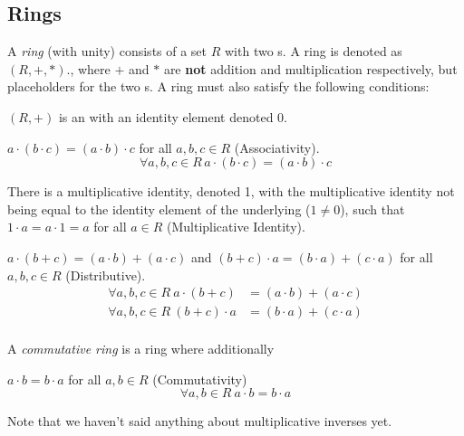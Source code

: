 \subsection{Rings}\label{subsec:Rings}
\begin{definition}[Ring]\label{def:Ring}
  A \emph{ring} (with unity) consists of a set $R$ with two s.
  A ring is denoted as $(R, +, *)$., where $+$ and $*$ are \textbf{not} addition and multiplication respectively, but placeholders for the two s.
  A ring must also satisfy the following conditions:
  \begin{propertylist}
  \item $(R, +)$ is an   with an identity element denoted 0.
  \item $a \cdot (b \cdot c) = (a \cdot b) \cdot c$ for all $a, b, c \in R$ (Associativity).\label{prop:Ring_Properties-Associativity}
    \begin{equation*}
      \forall a, b, c \in R \, a \cdot (b \cdot c) = (a \cdot b) \cdot c
    \end{equation*}

  \item There is a multiplicative identity, denoted 1, with the multiplicative identity not being equal to the identity element of the underlying   ($1 \neq 0$), such that $1 \cdot a = a \cdot 1 = a$ for all $a \in R$ (Multiplicative Identity).\label{prop:Ring_Properties-Multiplicative_Identity}
    
  \item $a \cdot (b+c) = (a \cdot b) + (a \cdot c)$ and $(b+c) \cdot a = (b \cdot a) + (c \cdot a)$ for all $a, b, c \in R$ (Distributive).\label{prop:Ring_Properties-Distributivity}
    \begin{equation*}
      \begin{aligned}
        \forall a, b, c \in R \: a \cdot (b+c) &= (a \cdot b) + (a \cdot c) \\
        \forall a, b, c \in R \: (b+c) \cdot a &= (b \cdot a) + (c \cdot a) \\
      \end{aligned}
    \end{equation*}
  \end{propertylist}
  
  A \emph{commutative ring} is a ring where additionally
  \begin{propertylist}[resume]
  \item $a \cdot b = b \cdot a$ for all $a, b \in R$ (Commutativity)\label{prop:Ring_Properties-Commutativity}
    \begin{equation*}
      \forall a, b \in R \: a \cdot b = b \cdot a
    \end{equation*}
  \end{propertylist}

  \begin{remark}\label{rmk:Ring_Multiplicative_Inverses}
    Note that we haven't said anything about multiplicative inverses yet.
  \end{remark}
\end{definition}

